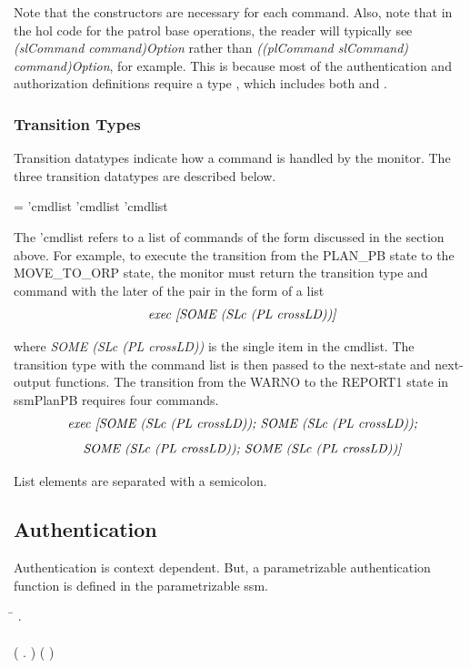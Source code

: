 \documentclass[../../main/main.tex]{subfiles}
\begin{document}
Note that the constructors are necessary for each command. Also, note that in the \gls{hol} code for the patrol base operations, the reader will typically see \textit{(slCommand command)Option} rather than \textit{((plCommand slCommand) command)Option}, for example.  This is because most of the authentication and authorization definitions require a type , which includes both   and .




\subsubsection{Transition Types}
Transition datatypes indicate how a command is handled by the monitor.  The three transition datatypes are described below. 

 =  'cmdlist \HOLTokenBar{}  'cmdlist \HOLTokenBar{}  'cmdlist

The 'cmdlist refers to a list of commands of the form discussed in the section above.  For example, to execute the transition from the PLAN_PB state to the MOVE_TO_ORP state, the monitor must return the transition type and command with the later of the pair in the form of a list 
\[\text{\textit{exec [SOME (SLc (PL crossLD))]}} \]

where \textit{SOME (SLc (PL crossLD))} is the single item in the cmdlist.  The transition type with the command list is then passed to the next-state and next-output functions.  The transition from the WARNO to the REPORT1 state in ssmPlanPB requires four commands.
\[\text{\textit{exec [SOME (SLc (PL crossLD)); SOME (SLc (PL crossLD));}} \]
\[\text{\textit{SOME (SLc (PL crossLD)); SOME (SLc (PL crossLD))]}} \]

List elements are separated with a semicolon.

\subsection{Authentication}
Authentication is context dependent. But, a parametrizable authentication function is defined in the parametrizable \gls{ssm}.

\begin{tabbing}
\parskip=8pt

\HOLTokenTurnstile{} \=\HOLSymConst{\HOLTokenForall{}} . \\
    \>     \HOLSymConst{\HOLTokenEquiv{}} \\
    \>  (\HOLTokenLambda{} .  \HOLSymConst{\HOLTokenConj{}} )  (  )
\parskip=18pt
\end{tabbing}
\end{document}
